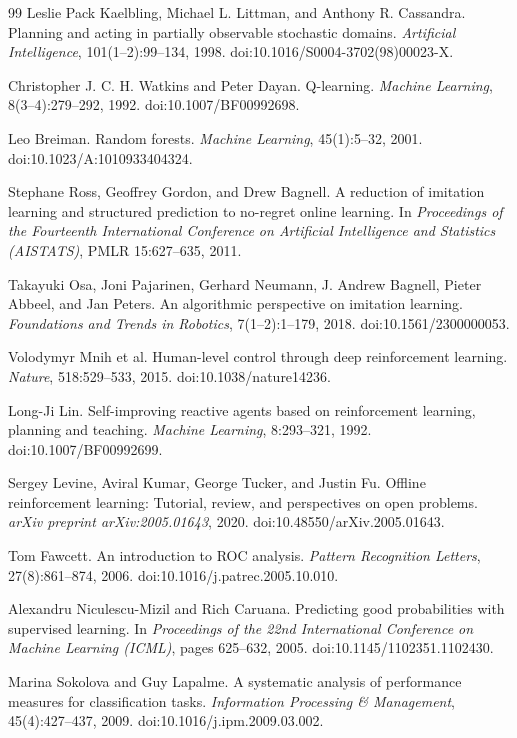 \documentclass[11pt]{article}
\begin{document}
\begin{thebibliography}{99}
Leslie Pack Kaelbling, Michael L. Littman, and Anthony R. Cassandra.
\newblock Planning and acting in partially observable stochastic domains.
\newblock \emph{Artificial Intelligence}, 101(1--2):99--134, 1998.
\newblock doi:10.1016/S0004-3702(98)00023-X.

Christopher J. C. H. Watkins and Peter Dayan.
\newblock Q-learning.
\newblock \emph{Machine Learning}, 8(3--4):279--292, 1992.
\newblock doi:10.1007/BF00992698.

Leo Breiman.
\newblock Random forests.
\newblock \emph{Machine Learning}, 45(1):5--32, 2001.
\newblock doi:10.1023/A:1010933404324.

Stephane Ross, Geoffrey Gordon, and Drew Bagnell.
\newblock A reduction of imitation learning and structured prediction to no-regret online learning.
\newblock In \emph{Proceedings of the Fourteenth International Conference on Artificial Intelligence and Statistics (AISTATS)}, PMLR 15:627--635, 2011.

Takayuki Osa, Joni Pajarinen, Gerhard Neumann, J. Andrew Bagnell, Pieter Abbeel, and Jan Peters.
\newblock An algorithmic perspective on imitation learning.
\newblock \emph{Foundations and Trends in Robotics}, 7(1--2):1--179, 2018.
\newblock doi:10.1561/2300000053.

Volodymyr Mnih et al.
\newblock Human-level control through deep reinforcement learning.
\newblock \emph{Nature}, 518:529--533, 2015.
\newblock doi:10.1038/nature14236.

Long-Ji Lin.
\newblock Self-improving reactive agents based on reinforcement learning, planning and teaching.
\newblock \emph{Machine Learning}, 8:293--321, 1992.
\newblock doi:10.1007/BF00992699.

Sergey Levine, Aviral Kumar, George Tucker, and Justin Fu.
\newblock Offline reinforcement learning: Tutorial, review, and perspectives on open problems.
\newblock \emph{arXiv preprint arXiv:2005.01643}, 2020.
\newblock doi:10.48550/arXiv.2005.01643.

Tom Fawcett.
\newblock An introduction to ROC analysis.
\newblock \emph{Pattern Recognition Letters}, 27(8):861--874, 2006.
\newblock doi:10.1016/j.patrec.2005.10.010.

Alexandru Niculescu-Mizil and Rich Caruana.
\newblock Predicting good probabilities with supervised learning.
\newblock In \emph{Proceedings of the 22nd International Conference on Machine Learning (ICML)}, pages 625--632, 2005.
\newblock doi:10.1145/1102351.1102430.

Marina Sokolova and Guy Lapalme.
\newblock A systematic analysis of performance measures for classification tasks.
\newblock \emph{Information Processing \& Management}, 45(4):427--437, 2009.
\newblock doi:10.1016/j.ipm.2009.03.002.

\end{thebibliography}
\end{document}
